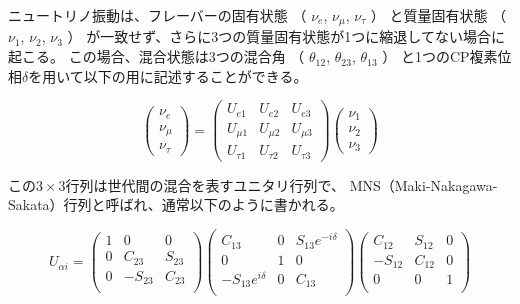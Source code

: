 ニュートリノ振動は、フレーバーの固有状態
（
$\nu_{e}$,
$\nu_{\mu}$,
$\nu_{\tau}$
）
と質量固有状態
（
$\nu_{1}$,
$\nu_{2}$,
$\nu_{3}$
）
が一致せず、さらに3つの質量固有状態が1つに縮退してない場合に起こる。
この場合、混合状態は3つの混合角
（
$\theta_{12}$,
$\theta_{23}$,
$\theta_{13}$
）
と1つのCP複素位相$\delta$を用いて以下の用に記述することができる。


\begin{equation}
    \begin{pmatrix}
        \nu_{e}\\
        \nu_{\mu}\\
        \nu_{\tau}
    \end{pmatrix}
    =
    \begin{pmatrix}
        U_{e1} & U_{e2} & U_{e3}\\
        U_{\mu1} & U_{\mu2} & U_{\mu3}\\
        U_{\tau1} & U_{\tau2} & U_{\tau3}
    \end{pmatrix}
    \begin{pmatrix}
        \nu_{1}\\
        \nu_{2}\\
        \nu_{3}
    \end{pmatrix}
\end{equation}


この$3 \times 3$行列は世代間の混合を表すユニタリ行列で、
MNS（Maki-Nakagawa-Sakata）行列と呼ばれ\cite{maki_remarks_1962}、通常以下のように書かれる。

\begin{equation}
    U_{\alpha i} =
    \begin{pmatrix}
        1 & 0 & 0 \\
        0 & C_{23} & S_{23} \\
        0 & -S_{23} & C_{23} \\
    \end{pmatrix}
    \begin{pmatrix}
        C_{13} & 0 & S_{13}e^{-i\delta} \\
        0 & 1 & 0 \\
        -S_{13}e^{i\delta} & 0 & C_{13} \\
    \end{pmatrix}
    \begin{pmatrix}
        C_{12} & S_{12} & 0 \\
        -S_{12} & C_{12} & 0 \\
        0 & 0 & 1 \\
    \end{pmatrix}
\end{equation}


